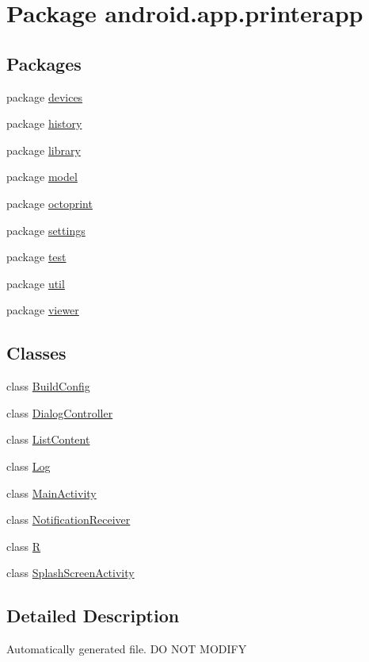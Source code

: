 \hypertarget{namespaceandroid_1_1app_1_1printerapp}{}\section{Package android.\+app.\+printerapp}
\label{namespaceandroid_1_1app_1_1printerapp}
\subsection*{Packages}
\begin{DoxyCompactItemize}
\item 
package \hyperlink{namespaceandroid_1_1app_1_1printerapp_1_1devices}{devices}
\item 
package \hyperlink{namespaceandroid_1_1app_1_1printerapp_1_1history}{history}
\item 
package \hyperlink{namespaceandroid_1_1app_1_1printerapp_1_1library}{library}
\item 
package \hyperlink{namespaceandroid_1_1app_1_1printerapp_1_1model}{model}
\item 
package \hyperlink{namespaceandroid_1_1app_1_1printerapp_1_1octoprint}{octoprint}
\item 
package \hyperlink{namespaceandroid_1_1app_1_1printerapp_1_1settings}{settings}
\item 
package \hyperlink{namespaceandroid_1_1app_1_1printerapp_1_1test}{test}
\item 
package \hyperlink{namespaceandroid_1_1app_1_1printerapp_1_1util}{util}
\item 
package \hyperlink{namespaceandroid_1_1app_1_1printerapp_1_1viewer}{viewer}
\end{DoxyCompactItemize}
\subsection*{Classes}
\begin{DoxyCompactItemize}
\item 
class \hyperlink{classandroid_1_1app_1_1printerapp_1_1_build_config}{Build\+Config}
\item 
class \hyperlink{classandroid_1_1app_1_1printerapp_1_1_dialog_controller}{Dialog\+Controller}
\item 
class \hyperlink{classandroid_1_1app_1_1printerapp_1_1_list_content}{List\+Content}
\item 
class \hyperlink{classandroid_1_1app_1_1printerapp_1_1_log}{Log}
\item 
class \hyperlink{classandroid_1_1app_1_1printerapp_1_1_main_activity}{Main\+Activity}
\item 
class \hyperlink{classandroid_1_1app_1_1printerapp_1_1_notification_receiver}{Notification\+Receiver}
\item 
class \hyperlink{classandroid_1_1app_1_1printerapp_1_1_r}{R}
\item 
class \hyperlink{classandroid_1_1app_1_1printerapp_1_1_splash_screen_activity}{Splash\+Screen\+Activity}
\end{DoxyCompactItemize}


\subsection{Detailed Description}
Automatically generated file. DO N\+OT M\+O\+D\+I\+FY 